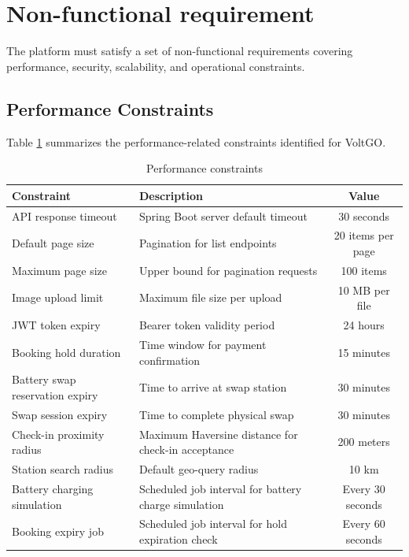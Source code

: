 \documentclass[../Main.tex]{subfiles}
\begin{document}
\section{Non-functional requirement}
\label{section:2.4}
The platform must satisfy a set of non-functional requirements covering performance, security, scalability, and operational constraints.

\subsection{Performance Constraints}
\label{subsection:2.4.1}
Table \ref{table:nfr_performance} summarizes the performance-related constraints identified for VoltGO.

\begin{table}[H]
\centering
\caption{Performance constraints}
\label{table:nfr_performance}
\begin{tabular}{lp{8cm}c}
    \hline
    \textbf{Constraint} & \textbf{Description} & \textbf{Value} \\ \hline
    API response timeout & Spring Boot server default timeout & 30 seconds \\
    Default page size & Pagination for list endpoints & 20 items per page \\
    Maximum page size & Upper bound for pagination requests & 100 items \\
    Image upload limit & Maximum file size per upload & 10 MB per file \\
    JWT token expiry & Bearer token validity period & 24 hours \\
    Booking hold duration & Time window for payment confirmation & 15 minutes \\
    Battery swap reservation expiry & Time to arrive at swap station & 30 minutes \\
    Swap session expiry & Time to complete physical swap & 30 minutes \\
    Check-in proximity radius & Maximum Haversine distance for check-in acceptance & 200 meters \\
    Station search radius & Default geo-query radius & 10 km \\
    Battery charging simulation & Scheduled job interval for battery charge simulation & Every 30 seconds \\
    Booking expiry job & Scheduled job interval for hold expiration check & Every 60 seconds \\
    \hline
\end{tabular}
\end{table}
\end{document}
